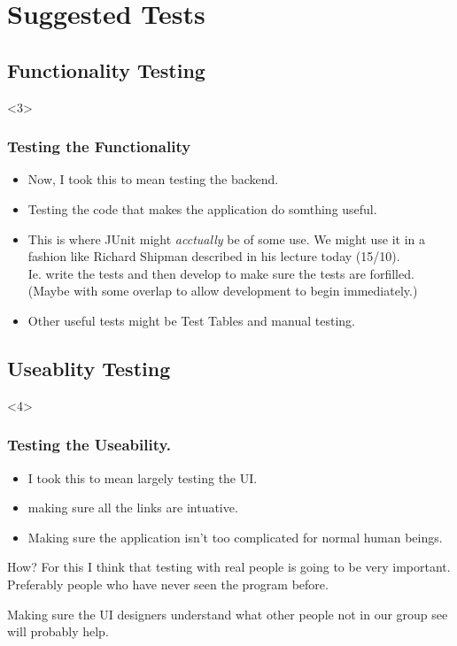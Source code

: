\documentclass{beamer}
\begin{document}
\section{Suggested Tests}
\subsection{Functionality Testing}

\begin{frame}<3>
\frametitle{Testing the Functionality}
\begin{itemize}
\item Now, I took this to mean testing the backend.
\item Testing the code that makes the application do somthing useful.
\item This is where JUnit might \emph{acctually} be of some use. We might use it
in a fashion like Richard Shipman described in his lecture today 
(15/10).\\
Ie. write the tests and then develop to make sure the 
tests are forfilled. (Maybe with some overlap to allow development
to begin immediately.)
\item Other useful tests might be Test Tables and manual testing.
\end{itemize}
\end{frame}

\subsection{Useablity Testing}

\begin{frame}<4>
\frametitle{Testing the Useability.}

\begin{itemize}
\item I took this to mean largely testing the UI.
\item making sure all the links are intuative.
\item Making sure the application isn't too complicated 
	for normal human beings.
\end{itemize}
\begin{block}{How?}
For this I think that testing with real people is going to be 
very important. Preferably people who have never seen the program
before.
\end{block}

Making sure the UI designers understand what other people not in
our group see will probably help.
\end{frame}
\end{document}

